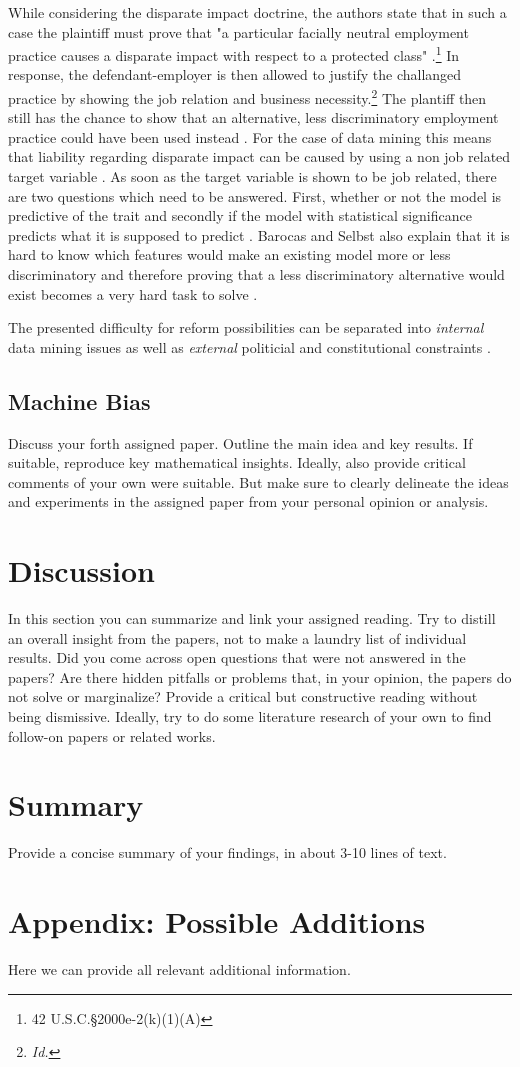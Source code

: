 \documentclass{article}
\begin{document}
While considering the disparate impact doctrine, the authors state that in such a case the plaintiff must prove that "a particular facially neutral employment practice causes a disparate impact with respect to a protected class" \cite{Barocas.2016} \cite{titleVII}.\footnote{ 42 U.S.C.§2000e-2(k)(1)(A) } In response, the defendant-employer is then allowed to justify the challanged practice by showing the job relation and business necessity.\footnote{ \textit{Id.} } The plantiff then still has the chance to show that an alternative, less discriminatory employment practice could have been used instead \cite{Barocas.2016}. For the case of data mining this means that liability regarding disparate impact can be caused by using a non job related target variable \cite{Barocas.2016}. As soon as the target variable is shown to be job related, there are two questions which need to be answered. First, whether or not the model is predictive of the trait and secondly if the model with statistical significance predicts what it is supposed to predict \cite{Barocas.2016}. Barocas and Selbst also explain that it is hard to know which features would make an existing model more or less discriminatory and therefore proving that a less discriminatory alternative would exist becomes a very hard task to solve \cite{Barocas.2016}.

The presented difficulty for reform possibilities can be separated into \textit{internal} data mining issues as well as \textit{external} politicial and constitutional  constraints \cite{Barocas.2016}. 
\subsection{Machine Bias}

Discuss your forth assigned paper. Outline the main idea and key results. If suitable, reproduce key mathematical insights. Ideally, also provide critical comments of your own were suitable. But make sure to clearly delineate the ideas and experiments in the assigned paper from your personal opinion or analysis.

\section{Discussion}

In this section you can summarize and link your assigned reading. Try to distill an overall insight from the papers, not to make a laundry list of individual results. Did you come across open questions that were not answered in the papers? Are there hidden pitfalls or problems that, in your opinion, the papers do not solve or marginalize? Provide a critical but constructive reading without being dismissive. Ideally, try to do some literature research of your own to find follow-on papers or related works. 

\section{Summary}

Provide a concise summary of your findings, in about 3-10 lines of text.

\section{Appendix: Possible Additions}
Here we can provide all relevant additional information.

\medskip
\small


\end{document}
